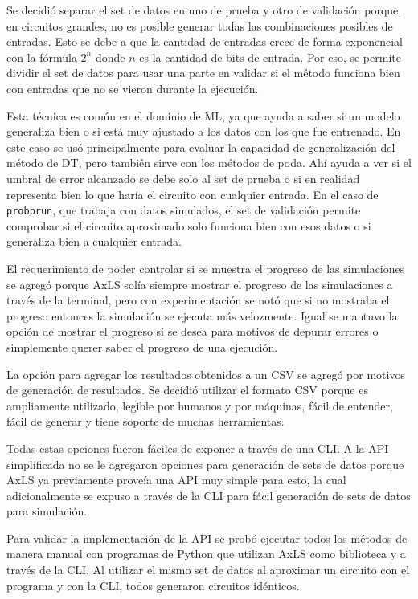 Se decidió separar el set de datos en uno de prueba y otro de validación
porque, en circuitos grandes, no es posible generar todas las combinaciones
posibles de entradas. Esto se debe a que la cantidad de entradas crece de forma
exponencial con la fórmula $2^n$ donde $n$ es la cantidad de bits de entrada.
Por eso, se permite dividir el set de datos para usar una parte en validar si
el método funciona bien con entradas que no se vieron durante la ejecución.

Esta técnica es común en el dominio de ML, ya que ayuda a saber si un modelo
generaliza bien o si está muy ajustado a los datos con los que fue entrenado.
En este caso se usó principalmente para evaluar la capacidad de generalización del método de DT, pero también sirve con los métodos de poda.
Ahí ayuda a ver si el umbral de error alcanzado se debe solo al set de prueba o
si en realidad representa bien lo que haría el circuito con cualquier entrada.
En el caso de \texttt{probprun}, que trabaja con datos simulados, el set de
validación permite comprobar si el circuito aproximado solo funciona bien con
esos datos o si generaliza bien a cualquier entrada.

El requerimiento de poder controlar si se muestra el progreso de las
simulaciones se agregó porque AxLS solía siempre mostrar el progreso de las
simulaciones a través de la terminal, pero con experimentación se notó que si
no mostraba el progreso entonces la simulación se ejecuta más velozmente. Igual
se mantuvo la opción de mostrar el progreso si se desea para motivos de depurar
errores o simplemente querer saber el progreso de una ejecución.

La opción para agregar los resultados obtenidos a un CSV se agregó por motivos
de generación de resultados. Se decidió utilizar el formato CSV porque es
ampliamente utilizado, legible por humanos y por máquinas, fácil de entender,
fácil de generar y tiene soporte de muchas herramientas.

Todas estas opciones fueron fáciles de exponer a través de una CLI. A la API
simplificada no se le agregaron opciones para generación de sets de datos porque
AxLS ya previamente proveía una API muy simple para esto, la cual
adicionalmente se expuso a través de la CLI para fácil generación de sets de
datos para simulación.

Para validar la implementación de la API se probó ejecutar todos los métodos de
manera manual con programas de Python que utilizan AxLS como biblioteca y a
través de la CLI. Al utilizar el mismo set de datos al aproximar un circuito
con el programa y con la CLI, todos generaron circuitos idénticos.

